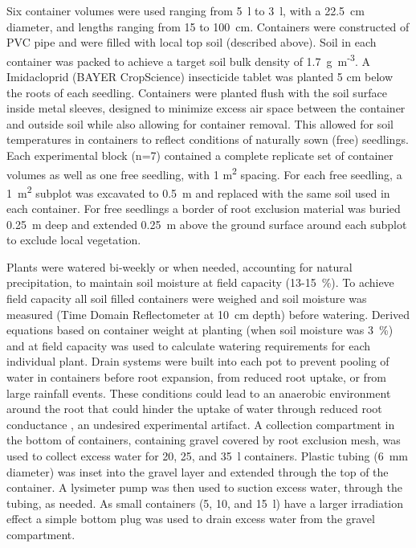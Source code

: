 \documentclass[a4paper]{article}\usepackage[]{graphicx}\usepackage[]{color}
\begin{document}
Six container volumes were used ranging from 5~l to 3~l, with a 22.5~cm diameter, and lengths ranging from 15 to 100~cm. Containers were constructed of PVC pipe and were filled with local top soil (described above). Soil in each container was packed to achieve a target soil bulk density of 1.7~g~m\textsuperscript{-3}. A Imidacloprid (BAYER CropScience) insecticide tablet was planted 5 cm below the roots of each seedling. Containers were planted flush with the soil surface inside metal sleeves, designed to minimize excess air space between the container and outside soil while also allowing for container removal. This allowed for soil temperatures in containers to reflect conditions of naturally sown (free) seedlings. Each experimental block (n=7) contained a complete replicate set of container volumes as well as one free seedling, with 1 m\textsuperscript{2} spacing. For each free seedling, a 1~m\textsuperscript{2} subplot was excavated to 0.5~m and replaced with the same soil used in each container. For free seedlings a border of root exclusion material was buried 0.25~m deep and extended 0.25~m above the ground surface around each subplot to exclude local vegetation.

Plants were watered bi-weekly or when needed, accounting for natural precipitation, to maintain soil moisture at field capacity (13-15~\%). To achieve field capacity all soil filled containers were weighed and soil moisture was measured (Time Domain Reflectometer at 10~cm depth) before watering. Derived equations based on container weight at planting (when soil moisture was 3~\%) and at field capacity was used to calculate watering requirements for each individual plant. Drain systems were built into each pot to prevent pooling of water in containers before root expansion, from reduced root uptake, or from large rainfall events. These conditions could lead to an anaerobic environment around the root that could hinder the uptake of water through reduced root conductance \citep{poorter2009causes}, an undesired experimental artifact. A collection compartment in the bottom of containers, containing gravel covered by root exclusion mesh, was used to collect excess water for 20, 25, and 35~l containers. Plastic tubing (6~mm diameter) was inset into the gravel layer and extended through the top of the container. A lysimeter pump was then used to suction excess water, through the tubing, as needed. As small containers (5, 10, and 15~l) have a larger irradiation effect a simple bottom plug was used to drain excess water from the gravel compartment.  
\end{document}
